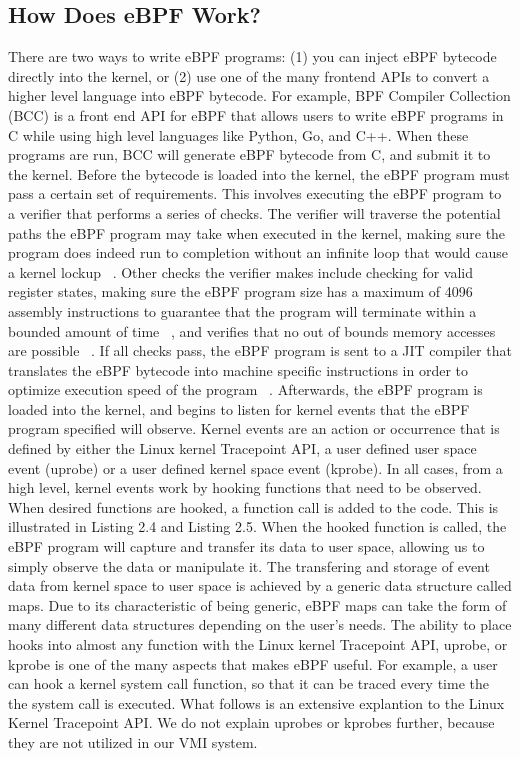 \documentclass{report}
\begin{document}
\begin{spacing}{1.5}
\subsection{How Does eBPF Work?}


{\large
There are two ways to write eBPF programs: (1) you can inject eBPF bytecode directly into the kernel, or (2) use one of the many frontend APIs to convert a higher level language into eBPF bytecode. For example, BPF Compiler Collection (BCC) is a front end API for eBPF that allows users to write eBPF programs in C while using high level languages like Python, Go, and C++. When these programs are run, BCC will generate eBPF bytecode from C, and submit it to the kernel. Before the bytecode is loaded into the kernel, the eBPF program must pass a certain set of requirements. This involves executing the eBPF program to a verifier that performs a series of checks. The verifier will traverse the potential paths the eBPF program may take when executed in the kernel, making sure the program does indeed run to completion without an infinite loop that would cause a kernel lockup ~\cite{findlay2021practical}. Other checks the verifier makes include checking for valid register states, making sure the eBPF program size has a maximum of 4096 assembly instructions to guarantee that the program will terminate within a bounded amount of time ~\cite{miano2018creating}, and verifies that no out of bounds memory accesses are possible ~\cite{findlay2021practical}. If all checks pass, the eBPF program is sent to a JIT compiler that translates the eBPF bytecode into machine specific instructions in order to optimize execution speed of the program ~\cite{miano2018creating}. Afterwards, the eBPF program is loaded into the kernel, and begins to listen for kernel events that the eBPF program specified will observe. Kernel events are an action or occurrence that is defined by either the Linux kernel Tracepoint API, a user defined user space event (uprobe) or a user defined kernel space event (kprobe). In all cases, from a high level, kernel events work by hooking functions that need to be observed. When desired functions are hooked, a function call is added to the code. This is illustrated in Listing 2.4 and Listing 2.5. When the hooked function is called, the eBPF program will capture and transfer its data to user space, allowing us to simply observe the data or manipulate it. The transfering and storage of event data from kernel space to user space is achieved by a generic data structure called maps. Due to its characteristic of being generic, eBPF maps can take the form of many different data structures depending on the user's needs. The ability to place hooks into almost any function with the Linux kernel Tracepoint API, uprobe, or kprobe is one of the many aspects that makes eBPF useful. For example, a user can hook a kernel system call function, so that it can be traced every time the the system call is executed. What follows is an extensive explantion to the Linux Kernel Tracepoint API. We do not explain uprobes or kprobes further, because they are not utilized in our VMI system.
\newline
}



\end{spacing}
\end{document}
